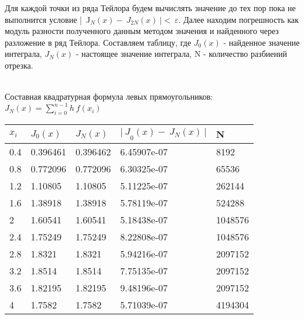 \documentclass[12pt,a4paper]{report}
\begin{document}
{	Для каждой точки из ряда Тейлора будем вычислять значение до тех пор пока не выполнится условие {|\ J}$_N\left(x\right)-\ J_{2N}\left(x\right)\ |<\ \varepsilon$. Далее находим погрешность как модуль разности полученного данным методом значения и найденного через разложение в ряд Тейлора. Составляем таблицу, где $J_0(x)$ - найденное значение интеграла, $J_N(x)$ - настоящее значение интеграла, N - количество разбиений отрезка.
	
	\noindent \\Составная квадратурная формула левых прямоугольников:
	\newline
	 $J_N\left(x\right)=\displaystyle\sum_{i=0}^{n-1}h\ f(x_i)$ \\
	
	\begin{center}
		\begin{tabular}{ | l | l | l | l | l | }
			\hline
			$x_i$	& $J_0(x)$	& $J_N(x)$	& ${|\ J}_0\left(x\right)-\ J_N\left(x\right)\ |$ &	N \\
			\hline
			0.4     & 0.396461  &  0.396462 &    6.45907e-07                                  & 8192\\
			\hline
		    0.8     & 0.772096  & 0.772096  & 6.30325e-07                                     & 65536\\
		    \hfill
		    1.2     & 1.10805   & 1.10805   & 5.11225e-07                                     & 262144\\
		    \hline
		    1.6     & 1.38918   & 1.38918   & 5.78119e-07                                     & 524288\\
		    \hline
		    2       & 1.60541   & 1.60541   & 5.18438e-07                                     & 1048576\\
		    \hline
		    2.4     & 1.75249   & 1.75249   & 8.22808e-07                                     & 1048576\\
		    \hline
		    2.8     & 1.8321    & 1.8321    & 5.94216e-07                                     & 2097152\\
		    \hline
		    3.2     & 1.8514    & 1.8514    & 7.75135e-07                                     & 2097152\\
		    \hline
		    3.6     & 1.82195   & 1.82195   & 9.48196e-07                                     & 2097152\\
		    \hline
		    4       & 1.7582    & 1.7582    & 5.71039e-07                                     & 4194304\\
			\hline
		\end{tabular}
	\end{center}
	
}
\end{document}
